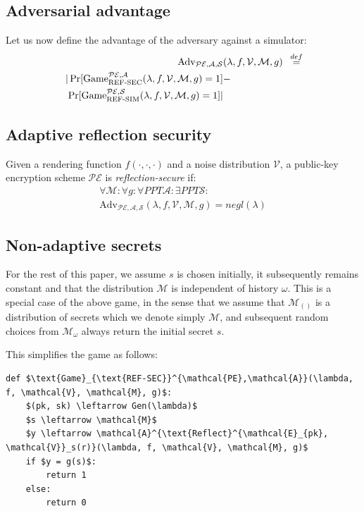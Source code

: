 \documentclass[conference, letterpaper, 10pt]{IEEEtran}
\newcommand\defeq{\stackrel{\mathclap{\normalfont\mbox{def}}}{=}}
\begin{document}
\subsection{Adversarial advantage}\label{subsec:refsecadv}

Let us now define the advantage of the adversary against a simulator:
\begin{align*}
    \text{Adv}_{\mathcal{PE}, \mathcal{A}, \mathcal{S}}&(\lambda, f, \mathcal{V}, \mathcal{M}, g) &\defeq\\
    |\Pr[\text{Game}_{\text{REF-SEC}}^{\mathcal{PE},\mathcal{A}}(\lambda, f, \mathcal{V}, \mathcal{M}, g) = 1] &-\\
    \Pr[\text{Game}_{\text{REF-SIM}}^{\mathcal{PE},\mathcal{S}}(\lambda, f, \mathcal{V}, \mathcal{M}, g) = 1]| &
\end{align*}

\subsection{Adaptive reflection security}\label{subsec:adaptiverefsec}

Given a rendering function $f(\cdot, \cdot, \cdot)$ and
a noise distribution $\mathcal{V}$, a public-key encryption scheme
$\mathcal{PE}$ is \textit{reflection-secure} if:
\begin{align*}
\forall \mathcal{M}:
\forall g:
\forall PPT \mathcal{A}:
\exists PPT \mathcal{S}:\\
\text{Adv}_{\mathcal{PE}, \mathcal{A}, \mathcal{S}}(\lambda, f, \mathcal{V}, \mathcal{M}, g) = negl(\lambda)
\end{align*}

\subsection{Non-adaptive secrets}\label{subsec:refsecnonadapt}

For the rest of this paper, we assume $s$ is chosen initially, it subsequently
remains constant and that the distribution $\mathcal{M}$ is independent of
history $\omega$. This is a special case of the above game, in the sense that we
assume that $\mathcal{M}_{()}$ is a distribution of secrets which we denote
simply $\mathcal{M}$, and subsequent random choices from $\mathcal{M}_\omega$
always return the initial secret $s$.

This simplifies the game as follows:

\begin{lstlisting}[texcl,mathescape,basicstyle=\small]
def $\text{Game}_{\text{REF-SEC}}^{\mathcal{PE},\mathcal{A}}(\lambda, f, \mathcal{V}, \mathcal{M}, g)$:
    $(pk, sk) \leftarrow Gen(\lambda)$
    $s \leftarrow \mathcal{M}$
    $y \leftarrow \mathcal{A}^{\text{Reflect}^{\mathcal{E}_{pk}, \mathcal{V}}_s(r)}(\lambda, f, \mathcal{V}, \mathcal{M}, g)$
    if $y = g(s)$:
        return 1
    else:
        return 0
\end{lstlisting}
\end{document}

